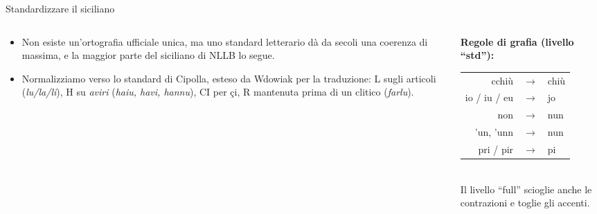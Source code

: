 \documentclass[aspectratio=169]{beamer}
\newcommand{\T}[2]{#2}
\newcommand{\T}[2]{#1}
\begin{document}
\begin{frame}{\T{Standardising Sicilian}{Standardizzare il siciliano}}
  \begin{columns}[t]
    \begin{column}{0.56\textwidth}
      \small
      \begin{itemize}
        \item \T{There is no single official orthography, but a literary standard has given a
              rough consistency for centuries, and most of the Sicilian in NLLB follows it.}%
              {Non esiste un'ortografia ufficiale unica, ma uno standard letterario d\`a da
              secoli una coerenza di massima, e la maggior parte del siciliano di NLLB lo
              segue.}
        \item \T{We normalise toward the standard of Cipolla, augmented by Wdowiak for MT:
              L on articles (\emph{lu/la/li}), H on \emph{aviri} (\emph{haiu, havi, hannu}), CI
              for \c{c}i, R kept before a clitic (\emph{farlu}).}%
              {Normalizziamo verso lo standard di Cipolla, esteso da Wdowiak per la traduzione:
              L sugli articoli (\emph{lu/la/li}), H su \emph{aviri} (\emph{haiu, havi, hannu}),
              CI per \c{c}i, R mantenuta prima di un clitico (\emph{farlu}).}
      \end{itemize}
    \end{column}
    \begin{column}{0.44\textwidth}
      \small
      \textbf{\T{Spelling rules (``std'' level):}{Regole di grafia (livello ``std''):}}\\[1mm]
      \begin{tabular}{rcl}
        cchi\`u & $\to$ & chi\`u \\
        io / iu / eu & $\to$ & jo \\
        non & $\to$ & nun \\
        'un, 'unn & $\to$ & nun \\
        pri / pir & $\to$ & pi \\
      \end{tabular}\\[2mm]
      \T{The ``full'' level also uncontracts and ASCII-folds.}%
      {Il livello ``full'' scioglie anche le contrazioni e toglie gli accenti.}
    \end{column}
  \end{columns}
\end{frame}
\end{document}
